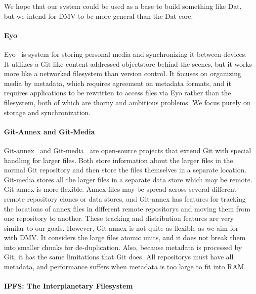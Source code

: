 We hope that our system could be used as a base to build something like Dat, but
we intend for \gls{DMV} to be more general than the Dat core.


\paragraph{Eyo}

Eyo~\cite{Strauss:2011:EDP:2002181.2002216} is system for storing personal media
and synchronizing it between devices. It utilizes a Git-like content-addressed
\gls{objectstore} behind the scenes, but it works more like a networked filesystem
than version control. It focuses on organizing media by metadata, which requires
agreement on metadata formats, and it requires applications to be rewritten to
access files via Eyo rather than the filesystem, both of which are thorny and
ambitious problems. We focus purely on storage and synchronization.


\paragraph{Git-Annex and Git-Media}

Git-annex~\cite{git_annex_homepage} and Git-media~\cite{git_media_github} are
open-source projects that extend Git with special handling for larger files.
Both store information about the larger files in the normal Git \gls{repository}
and then store the files themselves in a separate location. Git-media stores all
the larger files in a separate data store which may be remote. Git-annex is more
flexible. Annex files may be spread across several different remote
\gls{repository} clones or data stores, and Git-annex has features for tracking
the locations of annex files in different remote \glspl{repository} and moving
them from one \gls{repository} to another. These tracking and distribution
features are very similar to our goals. However, Git-annex is not quite as
flexible as we aim for with \gls{DMV}. It considers the large files atomic
units, and it does not break them into smaller chunks for de-duplication. Also,
because metadata is processed by Git, it has the same limitations that Git does.
All \glspl{repository} must have all metadata, and performance suffers when
metadata is too large to fit into RAM.


\paragraph{IPFS: The Interplanetary Filesystem}

